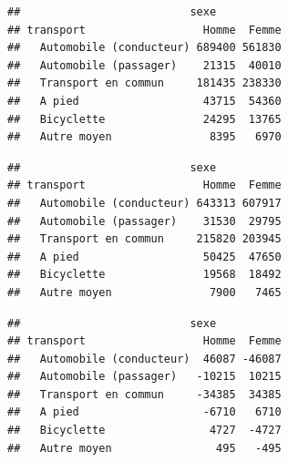 \documentclass[
  11pt,
  french,
]{book}
\makeatletter
\newenvironment{Shaded}{\begin{snugshade}}{\end{snugshade}}
\newcommand{\CommentTok}[1]{\textcolor[rgb]{0.56,0.35,0.01}{\textit{#1}}}
\newcommand{\DecValTok}[1]{\textcolor[rgb]{0.00,0.00,0.81}{#1}}
\newcommand{\KeywordTok}[1]{\textcolor[rgb]{0.13,0.29,0.53}{\textbf{#1}}}
\newcommand{\NormalTok}[1]{#1}
\newcommand{\OperatorTok}[1]{\textcolor[rgb]{0.81,0.36,0.00}{\textbf{#1}}}
\newenvironment{kframe}{%
\medskip{}
\setlength{\fboxsep}{.8em}
 \def\at@end@of@kframe{}%
 \ifinner\ifhmode%
  \def\at@end@of@kframe{\end{minipage}}%
  \begin{minipage}{\columnwidth}%
 \fi\fi%
 \def\FrameCommand##1{\hskip\@totalleftmargin \hskip-\fboxsep
 \colorbox{shadecolor}{##1}\hskip-\fboxsep
     \hskip-\linewidth \hskip-\@totalleftmargin \hskip\columnwidth}%
 \MakeFramed {\advance\hsize-\width
   \@totalleftmargin\z@ \linewidth\hsize
   \@setminipage}}%
 {\par\unskip\endMakeFramed%
 \at@end@of@kframe}
\renewenvironment{Shaded}{\begin{kframe}}{\end{kframe}}
\makeatother
\begin{document}
\begin{Shaded}
\end{Shaded}

\begin{verbatim}
##                          sexe
## transport                  Homme  Femme
##   Automobile (conducteur) 689400 561830
##   Automobile (passager)    21315  40010
##   Transport en commun     181435 238330
##   A pied                   43715  54360
##   Bicyclette               24295  13765
##   Autre moyen               8395   6970
\end{verbatim}

\begin{Shaded}
\end{Shaded}

\begin{verbatim}
##                          sexe
## transport                  Homme  Femme
##   Automobile (conducteur) 643313 607917
##   Automobile (passager)    31530  29795
##   Transport en commun     215820 203945
##   A pied                   50425  47650
##   Bicyclette               19568  18492
##   Autre moyen               7900   7465
\end{verbatim}

\begin{Shaded}
\end{Shaded}

\begin{verbatim}
##                          sexe
## transport                  Homme  Femme
##   Automobile (conducteur)  46087 -46087
##   Automobile (passager)   -10215  10215
##   Transport en commun     -34385  34385
##   A pied                   -6710   6710
##   Bicyclette                4727  -4727
##   Autre moyen                495   -495
\end{verbatim}
\end{document}
